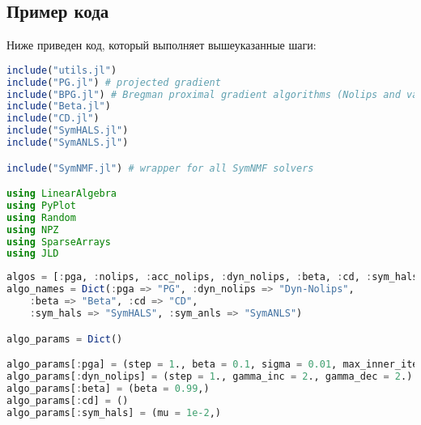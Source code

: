 \documentclass[a4paper,11pt]{article}
\begin{document}
\subsection{Пример кода}
\label{subsec:code-example}
Ниже приведен код, который выполняет вышеуказанные шаги:
\begin{lstlisting}[language=Julia, caption={Загрузка библиотек}, label={lst:example0}]
include("utils.jl")
include("PG.jl") # projected gradient 
include("BPG.jl") # Bregman proximal gradient algorithms (Nolips and variants)
include("Beta.jl")
include("CD.jl")
include("SymHALS.jl")
include("SymANLS.jl")

include("SymNMF.jl") # wrapper for all SymNMF solvers

using LinearAlgebra
using PyPlot
using Random
using NPZ
using SparseArrays
using JLD
\end{lstlisting}

\begin{lstlisting}[language=Julia, caption={Инициализация параметров}, label={lst:example1}]
algos = [:pga, :nolips, :acc_nolips, :dyn_nolips, :beta, :cd, :sym_hals]
algo_names = Dict(:pga => "PG", :dyn_nolips => "Dyn-Nolips",
    :beta => "Beta", :cd => "CD",
    :sym_hals => "SymHALS", :sym_anls => "SymANLS")

algo_params = Dict()

algo_params[:pga] = (step = 1., beta = 0.1, sigma = 0.01, max_inner_iter = 20)
algo_params[:dyn_nolips] = (step = 1., gamma_inc = 2., gamma_dec = 2.)
algo_params[:beta] = (beta = 0.99,)
algo_params[:cd] = ()
algo_params[:sym_hals] = (mu = 1e-2,)
\end{lstlisting}
\end{document}
